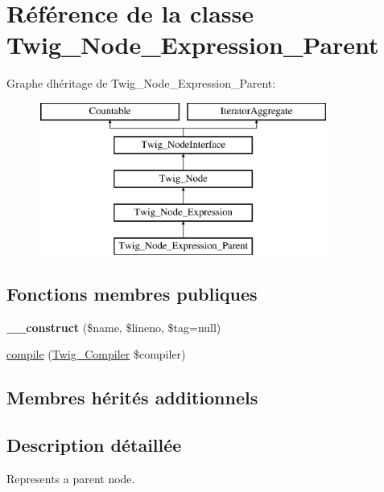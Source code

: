 \hypertarget{class_twig___node___expression___parent}{}\section{Référence de la classe Twig\+\_\+\+Node\+\_\+\+Expression\+\_\+\+Parent}
\label{class_twig___node___expression___parent}
Graphe d\textquotesingle{}héritage de Twig\+\_\+\+Node\+\_\+\+Expression\+\_\+\+Parent\+:\begin{figure}[H]
\begin{center}
\leavevmode
\includegraphics[height=5.000000cm]{class_twig___node___expression___parent}
\end{center}
\end{figure}
\subsection*{Fonctions membres publiques}
\begin{DoxyCompactItemize}
\item 
{\bfseries \+\_\+\+\_\+construct} (\$name, \$lineno, \$tag=null)\hypertarget{class_twig___node___expression___parent_a0028166bd229cdc2e0c0a79c4f3069fa}{}\label{class_twig___node___expression___parent_a0028166bd229cdc2e0c0a79c4f3069fa}

\item 
\hyperlink{class_twig___node___expression___parent_a4e0faa87c3fae583620b84d3607085da}{compile} (\hyperlink{class_twig___compiler}{Twig\+\_\+\+Compiler} \$compiler)
\end{DoxyCompactItemize}
\subsection*{Membres hérités additionnels}


\subsection{Description détaillée}
Represents a parent node.

